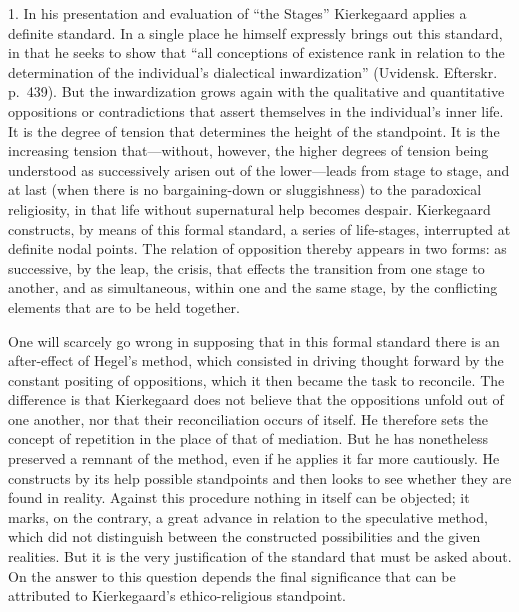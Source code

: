 \documentclass[12pt,a4paper]{book}
\newcommand{\opage}[1]{\marginnote{\footnotesize\textit{[#1]}}}
\begin{document}
1. In his presentation and evaluation of ``the Stages'' Kierkegaard
applies a definite standard. In a single place he himself expressly
brings out this standard, in that he seeks to show that ``all
conceptions of existence rank in relation to the determination of the
individual's dialectical inwardization'' (Uvidensk. Efterskr. p.~439).
But the inwardization grows again with the qualitative and quantitative
oppositions or contradictions that assert themselves in the individual's
inner life. It is the degree of tension that determines the height of
the standpoint. It is the increasing
\opage{120}tension that---without, however, the higher degrees of tension
being understood as successively arisen out of the lower---leads from
stage to stage, and at last (when there is no bargaining-down or
sluggishness) to the paradoxical religiosity, in that life without
supernatural help becomes despair. Kierkegaard constructs, by means of
this formal standard, a series of life-stages, interrupted at definite
nodal points. The relation of opposition thereby appears in two forms:
as successive, by the leap, the crisis, that effects the transition from
one stage to another, and as simultaneous, within one and the same
stage, by the conflicting elements that are to be held together.

One will scarcely go wrong in supposing that in this formal standard
there is an after-effect of Hegel's method, which consisted in driving
thought forward by the constant positing of oppositions, which it then
became the task to reconcile. The difference is that Kierkegaard does
not believe that the oppositions unfold out of one another, nor that
their reconciliation occurs of itself. He therefore sets the concept of
repetition in the place of that of mediation. But he has nonetheless
preserved a remnant of the method, even if he applies it far more
cautiously. He constructs by its help possible standpoints and then
looks to see whether they are found in reality. Against this procedure
nothing in itself can be objected; it marks, on the contrary, a great
advance in relation to the speculative method, which did not distinguish
between the constructed possibilities and the given realities. But it is
the very justification of the standard that must be asked about. On the
answer to this question depends the final significance that can be
attributed to Kierkegaard's ethico-religious standpoint.
\end{document}
